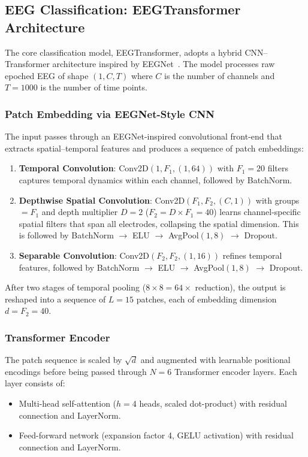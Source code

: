 \documentclass[12pt, a4paper]{article}
\begin{document}
\subsection{EEG Classification: EEGTransformer Architecture}

The core classification model, EEGTransformer, adopts a hybrid CNN--Transformer architecture inspired by EEGNet~\cite{lawhern2018eegnet}. The model processes raw epoched EEG of shape $(1, C, T)$ where $C$ is the number of channels and $T = 1000$ is the number of time points.

\subsubsection{Patch Embedding via EEGNet-Style CNN}

The input passes through an EEGNet-inspired convolutional front-end that extracts spatial--temporal features and produces a sequence of patch embeddings:

\begin{enumerate}
    \item \textbf{Temporal Convolution}: Conv2D$(1, F_1, (1, 64))$ with $F_1 = 20$ filters captures temporal dynamics within each channel, followed by BatchNorm.
    \item \textbf{Depthwise Spatial Convolution}: Conv2D$(F_1, F_2, (C, 1))$ with groups $= F_1$ and depth multiplier $D = 2$ ($F_2 = D \times F_1 = 40$) learns channel-specific spatial filters that span all electrodes, collapsing the spatial dimension. This is followed by BatchNorm $\rightarrow$ ELU $\rightarrow$ AvgPool$(1, 8)$ $\rightarrow$ Dropout.
    \item \textbf{Separable Convolution}: Conv2D$(F_2, F_2, (1, 16))$ refines temporal features, followed by BatchNorm $\rightarrow$ ELU $\rightarrow$ AvgPool$(1, 8)$ $\rightarrow$ Dropout.
\end{enumerate}

After two stages of temporal pooling ($8 \times 8 = 64\times$ reduction), the output is reshaped into a sequence of $L = 15$ patches, each of embedding dimension $d = F_2 = 40$.

\subsubsection{Transformer Encoder}

The patch sequence is scaled by $\sqrt{d}$ and augmented with learnable positional encodings before being passed through $N = 6$ Transformer encoder layers. Each layer consists of:
\begin{itemize}
    \item Multi-head self-attention ($h = 4$ heads, scaled dot-product) with residual connection and LayerNorm.
    \item Feed-forward network (expansion factor 4, GELU activation) with residual connection and LayerNorm.
\end{itemize}
\end{document}
